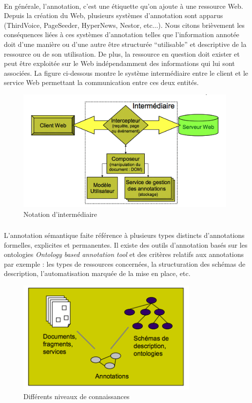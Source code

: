 \documentclass[12pt,a4	]{report}
\begin{document}
\paragraph{}
En générale, l'annotation, c'est une étiquette qu'on ajoute à une ressource Web. Depuis la création du Web, plusieurs systèmes d'annotation sont apparus (ThirdVoice, PageSeeder, HyperNews, Nestor, etc...).
Nous citons brièvement les conséquences liées à ces systèmes d'annotation telles que l'information annotée doit d'une manière ou d'une autre être structurée ``utilisable'' et descriptive de la ressource ou de son utilisation. De plus, la ressource en question doit exister et peut être exploitée sur le Web indépendamment des informations qui lui sont associées. La figure ci-dessous montre le système intermédiaire entre le client et le service Web permettant la communication entre ces deux entités.
\begin{figure}[H]
\centering
\includegraphics[width=11cm]{AnnotationSys.png}
\caption{Notation d'intermédiaire}
\end{figure}
\subparagraph{}
L'annotation sémantique faite référence à plusieurs types distincts d'annotations formelles, explicites et permanentes. Il existe des outils d'annotation basés sur les ontologies {\it Ontology based annotation tool}
et des critères relatifs aux annotations par exemple : les types de ressources concernées, la structuration des schémas de description, l'automatisation marquée de la mise en place, etc.
\begin{figure}[H]
\centering
\includegraphics[width=9cm]{diffConnaissances.png}
\caption{Différents niveaux de connaissances}
\end{figure}
\end{document}
